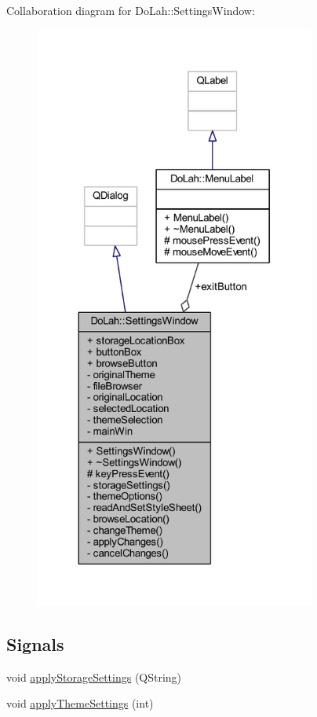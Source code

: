 Collaboration diagram for Do\+Lah\+:\+:Settings\+Window\+:\nopagebreak
\begin{figure}[H]
\begin{center}
\leavevmode
\includegraphics[height=550pt]{class_do_lah_1_1_settings_window__coll__graph}
\end{center}
\end{figure}
\subsection*{Signals}
\begin{DoxyCompactItemize}
\item 
void \hyperlink{class_do_lah_1_1_settings_window_ab14ecbfb57dd29932e83d956eeb4d61d}{apply\+Storage\+Settings} (Q\+String)
\item 
void \hyperlink{class_do_lah_1_1_settings_window_a8b87756e98d0f669fc0abe74df86a7d1}{apply\+Theme\+Settings} (int)
\end{DoxyCompactItemize}
